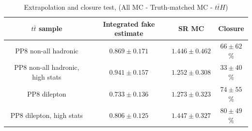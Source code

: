\documentclass[11pt]{article}
\begin{document}
	\begin{table}[htp]
	\caption{Extrapolation and closure test, (All MC - Truth-matched MC - $t\bar{t}H$) }
	\begin{center}
	\begin{tabular}{|c|c|c|c|}
	\hline
	$t\bar{t}$ sample 	& Integrated fake estimate	& SR MC	&  Closure \\
	\hline
	PP8 non-all hadronic			& 	$0.869\pm0.171$ 		& $1.446\pm0.462$ 		& $66\pm62$\% \\
	PP8 non-all hadronic, high stats	& 	$0.941\pm0.157$ 		& $1.252\pm0.308$		& $33\pm40$\% \\
	PP8 dilepton 					& 	$0.733\pm0.136$ 		& $1.273\pm0.323$		& $74\pm55$\% \\
	PP8 dilepton, high stats			& 	$0.806\pm0.125$ 		& $1.447\pm0.327$ 		& $80\pm49$\% \\
	\hline
	\end{tabular}
	\end{center}
	\label{default}
	\end{table}%
		
\end{document}
